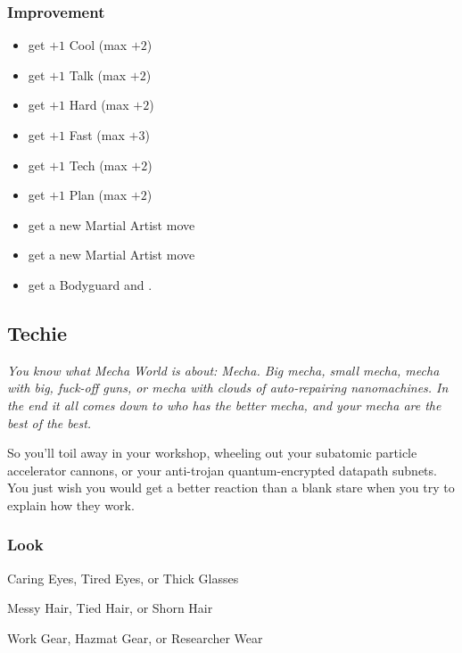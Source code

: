 
\subsubsection{Improvement}
\begin{itemize}
\item get $+1$ Cool (max $+2$)
\item get $+1$ Talk (max $+2$)
\item get $+1$ Hard (max $+2$)
\item get $+1$ Fast (max $+3$)
\item get $+1$ Tech (max $+2$)
\item get $+1$ Plan (max $+2$)
\item get a new Martial Artist move
\item get a new Martial Artist move
\item get a Bodyguard and .
\end{itemize}



\subsection{Techie}
{\itshape You know what Mecha World is about: Mecha. Big mecha, small
  mecha, mecha with big, fuck-off guns, or mecha with clouds of
  auto-repairing nanomachines. In the end it all comes down to who has
  the better mecha, and your mecha are the best of the best.

So you'll toil away in your workshop, wheeling out your subatomic
particle accelerator cannons, or your anti-trojan quantum-encrypted
datapath subnets. You just wish you would get a better reaction than a
blank stare when you try to explain how they work.}

\subsubsection{Look}

Caring Eyes, Tired Eyes, or Thick Glasses

Messy Hair, Tied Hair, or Shorn Hair

Work Gear, Hazmat Gear, or Researcher Wear

